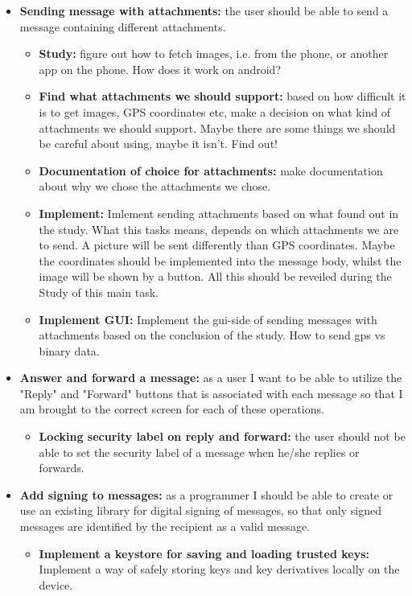 \begin{itemize}
\begin{itemize}
\end{itemize}
\item{}\textbf{Sending message with attachments:} the user should be able to send a message containing different attachments.
\begin{itemize}
\item{}\textbf{Study:} figure out how to fetch images, i.e. from the phone, or another app on the phone. How does it work on android?
\item{}\textbf{Find what attachments we should support:} based on how difficult it is to get images, GPS coordinates etc, make a decision on what kind of attachments we should support. Maybe there are some things we should be careful about using, maybe it isn't. Find out!
\item{}\textbf{Documentation of choice for attachments:} make documentation about why we chose the attachments we chose.
\item{}\textbf{Implement:} Imlement sending attachments based on what found out in the study. What this tasks means, depends on which attachments we are to send. A picture will be sent differently than GPS coordinates. Maybe the coordinates should be implemented into the message body, whilst the image will be shown by a button. All this should be reveiled during the Study of this main task. 
\item{}\textbf{Implement GUI:} Implement the gui-side of sending messages with attachments based on the conclusion of the study. How to send gps vs binary data.
\end{itemize}
\item{}\textbf{Answer and forward a message:} as a user I want to be able to utilize the "Reply" and "Forward" buttons that is associated with each message so that I am brought to the correct screen for each of these operations.
\begin{itemize}
\item{}\textbf{Locking security label on reply and forward:} the user should not be able to set the security label of a message when he/she replies or forwards.
\end{itemize}
\item{}\textbf{Add signing to messages:} as a programmer I should be able to create or use an existing library for digital signing of messages, so that only signed messages are identified by the recipient as a valid message.
\begin{itemize}
\item{}\textbf{Implement a keystore for saving and loading trusted keys:} Implement a way of safely storing keys and key derivatives locally on the device. 

\end{itemize}
\end{itemize}
